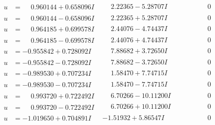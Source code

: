 \documentclass[1p]{elsarticle_modified}
\theoremstyle{definition}
\begin{document}
$$\begin{array}{c|c|c}
\begin{aligned}
u &= \phantom{-}0.960144 + 0.658096 I\end{aligned}
 & \phantom{-}2.22365 - 5.28707 I & \phantom{-0.000000 } 0 \\ \hline\begin{aligned}
u &= \phantom{-}0.960144 - 0.658096 I\end{aligned}
 & \phantom{-}2.22365 + 5.28707 I & \phantom{-0.000000 } 0 \\ \hline\begin{aligned}
u &= \phantom{-}0.964185 + 0.699578 I\end{aligned}
 & \phantom{-}2.44076 - 4.74437 I & \phantom{-0.000000 } 0 \\ \hline\begin{aligned}
u &= \phantom{-}0.964185 - 0.699578 I\end{aligned}
 & \phantom{-}2.44076 + 4.74437 I & \phantom{-0.000000 } 0 \\ \hline\begin{aligned}
u &= -0.955842 + 0.728092 I\end{aligned}
 & \phantom{-}7.88682 + 3.72650 I & \phantom{-0.000000 } 0 \\ \hline\begin{aligned}
u &= -0.955842 - 0.728092 I\end{aligned}
 & \phantom{-}7.88682 - 3.72650 I & \phantom{-0.000000 } 0 \\ \hline\begin{aligned}
u &= -0.989530 + 0.707234 I\end{aligned}
 & \phantom{-}1.58470 + 7.74715 I & \phantom{-0.000000 } 0 \\ \hline\begin{aligned}
u &= -0.989530 - 0.707234 I\end{aligned}
 & \phantom{-}1.58470 - 7.74715 I & \phantom{-0.000000 } 0 \\ \hline\begin{aligned}
u &= \phantom{-}0.993720 + 0.722492 I\end{aligned}
 & \phantom{-}6.70266 - 10.11200 I & \phantom{-0.000000 } 0 \\ \hline\begin{aligned}
u &= \phantom{-}0.993720 - 0.722492 I\end{aligned}
 & \phantom{-}6.70266 + 10.11200 I & \phantom{-0.000000 } 0 \\ \hline\begin{aligned}
u &= -1.019650 + 0.704891 I\end{aligned}
 & -1.51932 + 5.86547 I & \phantom{-0.000000 } 0 \\ \hline\begin{aligned}

\end{aligned}
\end{array}$$
\end{document}
